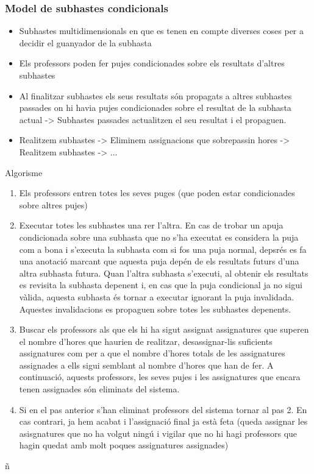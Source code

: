 \documentclass[10pt,twocolumn]{article}
\begin{document}
\subsubsection{Model de subhastes condicionals}
\begin{itemize}
	\item Subhastes multidimensionals en que es tenen en compte diverses coses per a decidir el guanyador de la subhasta
	\item Els professors poden fer pujes condicionades sobre els resultats d'altres subhastes
	\item Al finalitzar subhastes els seus resultats són propagats a altres subhastes passades on hi havia pujes condicionades sobre el resultat de la subhasta actual -> Subhastes passades actualitzen el seu resultat i el propaguen.
	\item Realitzem subhastes -> Eliminem assignacions que sobrepassin hores -> Realitzem subhastes -> ...
\end{itemize}

Algorisme
\begin{enumerate}
	\item Els professors entren totes les seves puges (que poden estar condicionades sobre altres pujes)
	\item Executar totes les subhastes una rer l'altra. En cas de trobar un apuja condicionada sobre una subhasta que no s'ha executat es considera la puja com a bona i s'executa la subhasta com si fos una puja normal, depsrés es fa una anotació marcant que aquesta puja depén de els resultats futurs d'una altra subhasta futura. Quan l'altra subhasta s'executi, al obtenir els resultats es revisita la subhasta depenent i, en cas que la puja condicional ja no sigui vàlida, aquesta subhasta és tornar a executar ignorant la puja invalidada. Aquestes invalidacions es propaguen sobre totes les subhastes depenents.
	\item Buscar els professors als que els hi ha sigut assignat assignatures que superen el nombre d'hores que haurien de realitzar, desassignar-lis suficients assignatures com per a que el nombre d'hores totals de les assignatures assignades a ells sigui semblant al nombre d'hores que han de fer. A continuació, aquests professors, les seves pujes i les assignatures que encara tenen assignades són eliminats del sistema.
	\item Si en el pas anterior s'han eliminat professors del sistema tornar al pas 2. En cas contrari, ja hem acabat i l'assignació final ja està feta (queda assignar les asisgnatures que no ha volgut ningú i vigilar que no hi hagi professors que hagin quedat amb molt poques assignatures assignades)
\end{enumerate}
ñ
\\
\newpage
\end{document}
